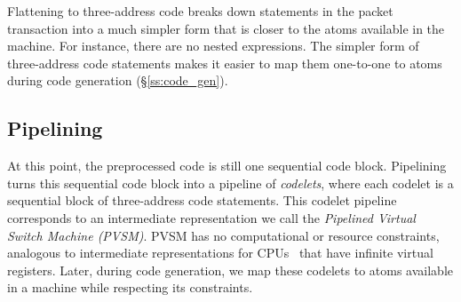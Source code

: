 Flattening to three-address code breaks down
statements in the packet transaction into a much simpler form that is closer
to the atoms available in the \absmachine machine. For instance, there are no
nested expressions. The simpler form of three-address code statements
makes it easier to map them one-to-one to atoms during code generation (\S\ref{ss:code_gen}).


\subsection{Pipelining}
\label{ss:pipelining}
At this point, the preprocessed code is still one sequential code block.
Pipelining turns this sequential code block into a pipeline of
\textit{codelets}, where each codelet is a sequential block of three-address
code statements. This codelet pipeline corresponds to an intermediate
representation we call the \textit{Pipelined Virtual Switch Machine (PVSM)}.
PVSM has no computational or resource constraints, analogous to intermediate
representations for CPUs~\cite{llvm} that have infinite virtual
registers. Later, during code generation, we map these codelets to atoms
available in a \absmachine machine while respecting its constraints.

